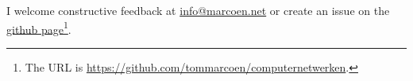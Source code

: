 
I welcome constructive feedback at \href{mailto:info@marcoen.net}{info@\-marcoen.net} or create an issue on the \href{https://github.com/tommarcoen/computernetwerken}{github page}\footnote{The \acs{URL} is \url{https://github.com/tommarcoen/computernetwerken}.}.